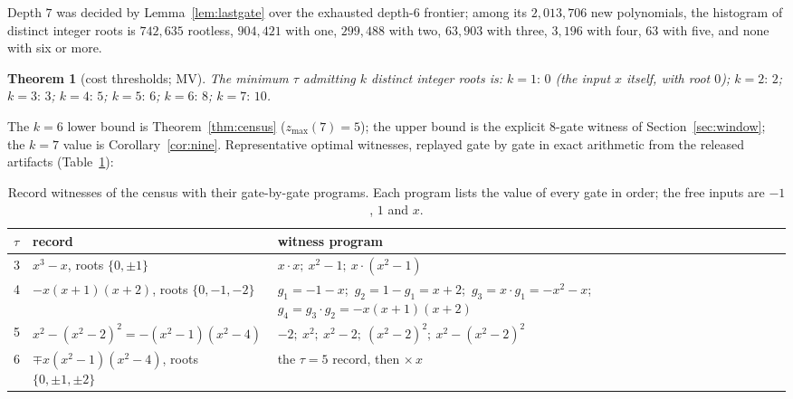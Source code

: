 \documentclass[11pt]{article}
\newtheorem{theorem}{Theorem}[section]
\theoremstyle{definition}
\theoremstyle{remark}
\newcommand{\zmax}{z_{\max}}
\begin{document}
Depth $7$ was decided by Lemma~\ref{lem:lastgate} over the exhausted depth-$6$
frontier; among its $2{,}013{,}706$ new polynomials, the histogram of distinct
integer roots is $742{,}635$ rootless, $904{,}421$ with one, $299{,}488$ with two,
$63{,}903$ with three, $3{,}196$ with four, $63$ with five, and none with six or
more.

\begin{theorem}[cost thresholds; MV]\label{thm:thresholds}
The minimum $\tau$ admitting $k$ distinct integer roots is: $k=1{:}\,0$ (the input $x$ itself, with root $0$); $k=2{:}\,2$; $k=3{:}\,3$; $k=4{:}\,5$; $k=5{:}\,6$; $k=6{:}\,8$; $k=7{:}\,10$.
\end{theorem}

The $k = 6$ lower bound is Theorem~\ref{thm:census} ($\zmax(7) = 5$); the upper
bound is the explicit $8$-gate witness of Section~\ref{sec:window}; the $k = 7$
value is Corollary~\ref{cor:nine}. Representative
optimal witnesses, replayed gate by gate in exact arithmetic from the released
artifacts (Table~\ref{tab:witnesses}):

\begin{table}[t]
\centering
\small
\caption{Record witnesses of the census with their gate-by-gate programs. Each program
lists the value of every gate in order; the free inputs are $-1$, $1$ and $x$.}
\label{tab:witnesses}
\begin{tabular}{@{}l>{\raggedright\arraybackslash}p{4.4cm}>{\raggedright\arraybackslash}p{9.2cm}@{}}
\toprule
$\tau$ & record & witness program\\
\midrule
3 & $x^3 - x$, roots $\{0,\pm1\}$ & $x{\cdot}x;\ x^2{-}1;\ x{\cdot}(x^2{-}1)$\\
4 & $-x(x{+}1)(x{+}2)$, roots $\{0,-1,-2\}$ & $g_1 = {-}1{-}x$;\ $g_2 = 1 - g_1 = x{+}2$;\ $g_3 = x\cdot g_1 = {-}x^2{-}x$;\ $g_4 = g_3 \cdot g_2 = -x(x{+}1)(x{+}2)$\\
5 & $x^2 - (x^2{-}2)^2 = -(x^2{-}1)(x^2{-}4)$ & $-2;\ x^2;\ x^2{-}2;\ (x^2{-}2)^2;\ x^2 - (x^2{-}2)^2$\\
6 & $\mp x(x^2{-}1)(x^2{-}4)$, roots $\{0,\pm1,\pm2\}$ & the $\tau{=}5$ record, then $\times\, x$\\
\bottomrule
\end{tabular}
\end{table}
\end{document}

